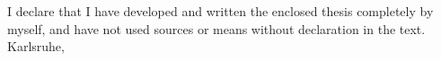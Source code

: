 I declare that I have developed and written the enclosed thesis completely by myself, and have not used sources or means without declaration in the text.
\\[10ex]

\underline{\hspace{6cm}} \newline
Karlsruhe,  \deadline \\[4ex]


